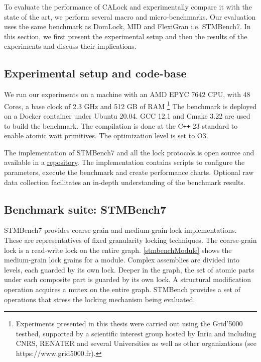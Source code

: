 To evaluate the performance of CALock and experimentally compare it with the state of the art, we perform several macro and micro-benchmarks. Our evaluation uses the same benchmark as DomLock, MID and FlexiGran \cite{kalikar2016domlock,anjuMID,FlexiGran2024} i.e. STMBench7\cite{guerraoui2006stmbench7}. In this section, we first present the experimental setup and then the results of the experiments and discuss their implications. 

\subsection{Experimental setup and code-base}

We run our experiments on a machine with an AMD EPYC 7642 CPU, with 48 Cores, a base clock of 2.3 GHz and 512 GB of RAM \footnote{Experiments presented in this thesis were carried out using the Grid'5000 testbed, supported by a scientific interest group hosted by Inria and including CNRS, RENATER and several Universities as well as other organizations (see https://www.grid5000.fr).} 
The benchmark is deployed on a Docker container under Ubuntu 20.04. 
GCC 12.1 and Cmake 3.22 are used to build the benchmark. The compilation is done at the C\texttt{++} 23 standard to enable atomic wait primitives. The optimization level is set to O3.

The implementation of STMBench7  and all the lock protocols is open source and available in a \href{https://github.com/ayushpandey8439/CALockBench}{\color{blue}\underline{repository}}. The implementation contains scripts to configure the parameters, execute the benchmark and create performance charts. Optional raw data collection facilitates an in-depth understanding of the benchmark results.


\subsection{Benchmark suite: STMBench7}
	
STMBench7 provides coarse-grain and medium-grain lock implementations. These are representatives of fixed granularity locking techniques.   
The coarse-grain lock is a read-write lock on the entire graph. 
\cref{stmbenchModule} shows the medium-grain lock grains for a module. 
Complex assemblies are divided into levels, each guarded by its own lock.
Deeper in the graph, the set of atomic parts under each composite part is guarded by its own lock.
A structural modification operation acquires a mutex on the entire graph. STMBench provides a set of operations that stress the locking mechanism being evaluated. 

